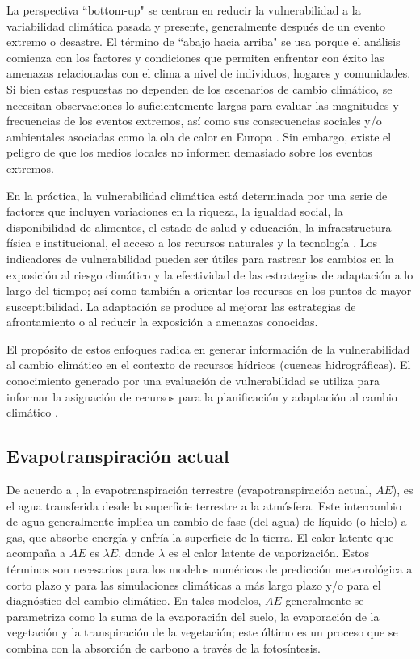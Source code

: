 \documentclass[12pt]{article}
\begin{document}
La perspectiva “bottom-up" se centran en reducir la vulnerabilidad a la variabilidad climática pasada y presente, generalmente después de un evento extremo o desastre. El término de “abajo hacia arriba" se usa porque el análisis comienza con los factores y condiciones que permiten enfrentar con éxito las amenazas relacionadas con el clima a nivel de individuos, hogares y comunidades. Si bien estas respuestas no dependen de los escenarios de cambio climático, se necesitan observaciones lo suficientemente largas para evaluar las magnitudes y frecuencias de los eventos extremos, así como sus consecuencias sociales y/o ambientales asociadas como la ola de calor en Europa \citep{Palutikof2004}. Sin embargo, existe el peligro de que los medios locales no informen demasiado sobre los eventos extremos.

En la práctica, la vulnerabilidad climática está determinada por una serie de factores que incluyen variaciones en la riqueza, la igualdad social, la disponibilidad de alimentos, el estado de salud y educación, la infraestructura física e institucional, el acceso a los recursos naturales y la tecnología \citep{Brooks2005}. Los indicadores de vulnerabilidad pueden ser útiles para rastrear los cambios en la exposición al riesgo climático y la efectividad de las estrategias de adaptación a lo largo del tiempo; así como también a orientar los recursos en los puntos de mayor susceptibilidad. La adaptación se produce al mejorar las estrategias de afrontamiento o al reducir la exposición a amenazas conocidas.

El propósito de estos enfoques radica en generar información de la vulnerabilidad al cambio climático en el contexto de recursos hídricos (cuencas hidrográficas). El conocimiento generado por una evaluación de vulnerabilidad se utiliza para informar la asignación de recursos para la planificación y adaptación al cambio climático \citep{nelitz2013tools,Dessai2004}. 

\subsection{Evapotranspiración actual}

De acuerdo a \citet{wang2012review}, la evapotranspiración terrestre (evapotranspiración actual, $AE$), es el agua transferida desde la superficie terrestre a la atmósfera. Este intercambio de agua generalmente implica un cambio de fase (del agua) de líquido (o hielo) a gas, que absorbe energía y enfría la superficie de la tierra. El calor latente que acompaña a $AE$ es $\lambda E$, donde $\lambda$ es el calor latente de vaporización. Estos términos son necesarios para los modelos numéricos de predicción meteorológica a corto plazo y para las simulaciones climáticas a más largo plazo y/o para el diagnóstico del cambio climático. En tales modelos, $AE$ generalmente se parametriza como la suma de la evaporación del suelo, la evaporación de la vegetación y la transpiración de la vegetación; este último es un proceso que se combina con la absorción de carbono a través de la fotosíntesis.
\end{document}
